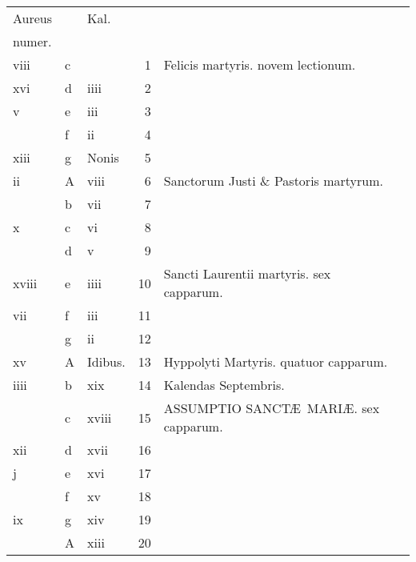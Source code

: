 \documentclass[11pt,openany]{book}
\begin{document}
\begin{center}
\begin{tabular}{l | l | l | r | l r}
\color{Red}Aureus & & \color{Red} Kal. & & \color{Red} \\
\color{Red}numer. & & & & \color{Red} \\
\color{Red} viii & c & & 1 & Felicis martyris. \color{Red} novem lectionum. & \color{Red} \\
\color{Red} xvi & d & \color{Red} iiii & 2 & & \color{Red} \\
\color{Red} v & e & \color{Red} iii & 3 & & \color{Red} \\
\color{Red}  & f & \color{Red} ii & 4 & & \color{Red} \\
\color{Red} xiii & g & Nonis & 5 & & \color{Red} \\
\color{Red} ii & \color{Red} A & \color{Red} viii & 6 & Sanctorum Justi \& Pastoris martyrum. & \color{Red} \\
\color{Red}  & b & \color{Red} vii & 7 & & \color{Red} \\
\color{Red} x & c & \color{Red} vi & 8 & & \color{Red} \\
\color{Red}  & d & \color{Red} v & 9 & & \color{Red} \\
\color{Red} xviii & e & \color{Red} iiii & 10 & \color{Red} Sancti Laurentii martyris. \color{black} sex capparum. & \color{Red} \\
\color{Red} vii & f & \color{Red} iii & 11 & & \color{Red} \\
\color{Red}  & g & \color{Red} ii & 12 & & \color{Red} \\
\color{Red} xv & \color{Red} A & Idibus. & 13 & Hyppolyti Martyris. \color{Red} quatuor capparum. & \color{Red} \\
\color{Red} iiii & b & \color{Red} xix & 14 & \qquad \color{Red} Kalendas Septembris. & \color{Red} \\
\color{Red}  & c & \color{Red} xviii & 15 & \color{Red} ASSUMPTIO SANCT\AE \ MARI\AE . \color{black} sex capparum. & \color{Red} \\
\color{Red} xii & d & \color{Red} xvii & 16 & & \color{Red} \\
\color{Red} j & e & \color{Red} xvi & 17 & & \color{Red} \\
\color{Red}  & f & \color{Red} xv & 18 & & \color{Red} \\
\color{Red} ix & g & \color{Red} xiv & 19 & & \color{Red} \\
\color{Red}  & \color{Red} A & \color{Red} xiii & 20 & & \color{Red} \\

\end{tabular}
\end{center}
\end{document}
